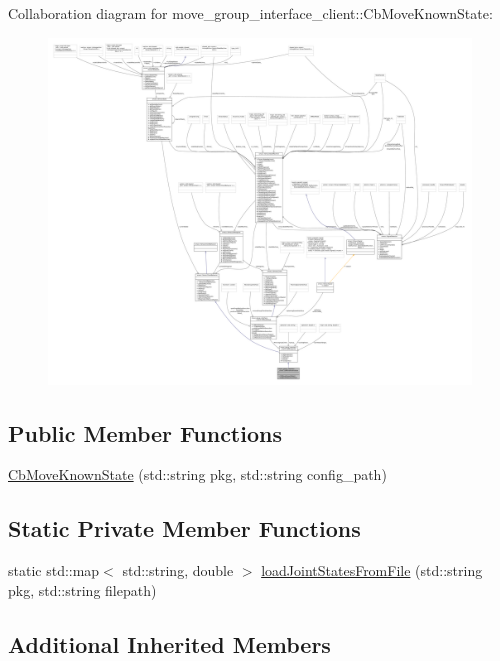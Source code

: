 Collaboration diagram for move\+\_\+group\+\_\+interface\+\_\+client\+:\+:Cb\+Move\+Known\+State\+:
\nopagebreak
\begin{figure}[H]
\begin{center}
\leavevmode
\includegraphics[width=350pt]{classmove__group__interface__client_1_1CbMoveKnownState__coll__graph}
\end{center}
\end{figure}
\subsection*{Public Member Functions}
\begin{DoxyCompactItemize}
\item 
\hyperlink{classmove__group__interface__client_1_1CbMoveKnownState_a40ec0e13fe77943e15ab83b5d7aca7ac}{Cb\+Move\+Known\+State} (std\+::string pkg, std\+::string config\+\_\+path)
\end{DoxyCompactItemize}
\subsection*{Static Private Member Functions}
\begin{DoxyCompactItemize}
\item 
static std\+::map$<$ std\+::string, double $>$ \hyperlink{classmove__group__interface__client_1_1CbMoveKnownState_af00c5ee81dfa5dd0817135279df09d74}{load\+Joint\+States\+From\+File} (std\+::string pkg, std\+::string filepath)
\end{DoxyCompactItemize}
\subsection*{Additional Inherited Members}


